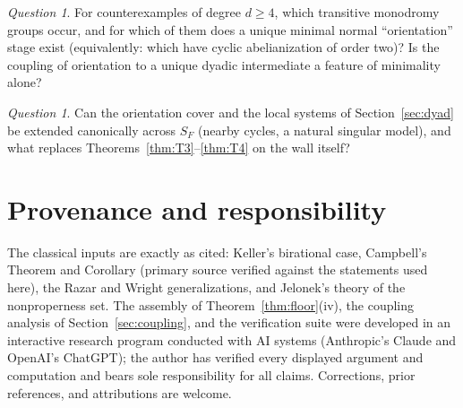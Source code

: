 \documentclass[11pt,reqno]{amsart}
\numberwithin{equation}{section}
\theoremstyle{remark}
\newtheorem{question}[theorem]{Question}
\newcommand{\SF}{S_F}
\begin{document}
\begin{question}\label{q:higher}
For counterexamples of degree $d\ge4$, which transitive monodromy groups
occur, and for which of them does a unique minimal normal ``orientation''
stage exist (equivalently: which have cyclic abelianization of order two)?
Is the coupling of orientation to a unique dyadic intermediate a feature of
minimality alone?
\end{question}

\begin{question}\label{q:wall}
Can the orientation cover and the local systems of
Section~\ref{sec:dyad} be extended canonically across $\SF$ (nearby cycles,
a natural singular model), and what replaces
Theorems~\ref{thm:T3}--\ref{thm:T4} on the wall itself?
\end{question}

\section*{Provenance and responsibility}

The classical inputs are exactly as cited: Keller's birational case,
Campbell's Theorem and Corollary (primary source verified against the
statements used here), the Razar and Wright generalizations, and Jelonek's
theory of the nonproperness set. The assembly of
Theorem~\ref{thm:floor}(iv), the coupling analysis of
Section~\ref{sec:coupling}, and the verification suite were developed in an
interactive research program conducted with AI systems (Anthropic's Claude
and OpenAI's ChatGPT); the author has verified every displayed argument and
computation and bears sole responsibility for all claims. Corrections,
prior references, and attributions are welcome.
\end{document}
